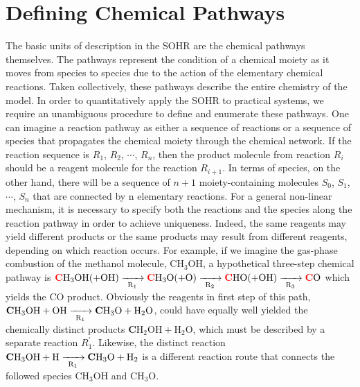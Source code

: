 \section{Defining Chemical Pathways}
\label{ch2:def_path}
The basic units of description in the SOHR are the chemical pathways themselves. The
pathways represent the condition of a chemical moiety as it moves from species to species
due to the action of the elementary chemical reactions. Taken collectively, these
pathways describe the entire chemistry of the model. In order to quantitatively apply
the SOHR to practical systems, we require an unambiguous procedure to define and
enumerate these pathways. One can imagine a reaction pathway as either a sequence of reactions or a sequence of species that propagates the chemical moiety through the
chemical network. If the reaction sequence is $R_1$, $R_2$, $\cdots$, $R_n$, then the product molecule
from reaction $R_i$ should be a reagent molecule for the reaction $R_{i+1}$. In terms of species,
on the other hand, there will be a sequence of $n + 1$ moiety-containing molecules $S_0$,
$S_1$, $\cdots$, $S_n$ that are connected by n elementary reactions. For a general non-linear mechanism,
it is necessary to specify both the reactions and the species along the reaction
pathway in order to achieve uniqueness. Indeed, the same reagents may yield different
products or the same products may result from different reagents, depending on which
reaction occurs. For example, if we imagine the gas-phase combustion of the methanol
molecule, CH$_3$OH, a hypothetical three-step chemical pathway is $\textcolor{red}{\textbf{C}}\text{H}_3\text{OH}(+\text{OH}) \xrightarrow[\text{R}_{1}]{\makebox[0.6cm]{}} \textcolor{red}{\textbf{C}}\text{H}_3\text{O} (+\text{O})  \xrightarrow[\text{R}_{2}]{\makebox[0.6cm]{}} \textcolor{red}{\textbf{C}}\text{HO} (+\text{OH}) \xrightarrow[\text{R}_{3}]{\makebox[0.6cm]{}} \textcolor{red}{\textbf{C}}\text{O}$ which yields the CO product. Obviously the reagents in first step of this path, ${\textbf{C}}\text{H}_3\text{OH}+\text{OH} \xrightarrow[\text{R}_{1}]{\makebox[0.6cm]{}} {\textbf{C}}\text{H}_3\text{O} + \text{H}_2\text{O}$, could have equally well yielded the chemically distinct products ${\textbf{C}}\text{H}_2\text{OH} + \text{H}_2\text{O}$, which must be described by a separate
reaction $R_1^{\prime}$. Likewise, the distinct reaction ${\textbf{C}}\text{H}_3\text{OH}+\text{H} \xrightarrow[\text{R}_{1}]{\makebox[0.6cm]{}} {\textbf{C}}\text{H}_3\text{O} + \text{H}_2$ is a different reaction route that connects the followed species CH$_3$OH and CH$_3$O.
\newline
